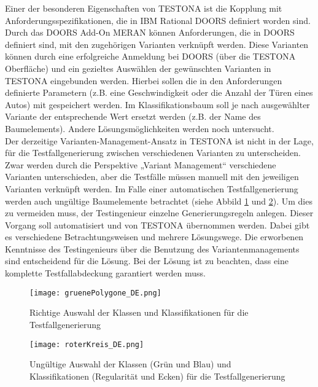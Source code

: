 Einer der besonderen Eigenschaften von TESTONA ist die Kopplung mit Anforderungsspezifikationen, die in IBM Rational DOORS definiert worden sind. Durch das DOORS Add-On MERAN können Anforderungen, die in DOORS definiert sind, mit den zugehörigen Varianten verknüpft werden. Diese Varianten können durch eine erfolgreiche Anmeldung bei DOORS (über die TESTONA Oberfläche) und ein gezieltes Auswählen der gewünschten Varianten in TESTONA eingebunden werden. Hierbei sollen die in den Anforderungen definierte Parametern (z.B. eine Geschwindigkeit oder die Anzahl der Türen eines Autos) mit gespeichert werden. Im Klassifikationsbaum soll je nach ausgewählter Variante der entsprechende Wert ersetzt werden (z.B. der Name des Baumelements). Andere Lösungsmöglichkeiten werden noch untersucht.\\

Der derzeitige Varianten-Management-Ansatz in TESTONA ist nicht in der Lage, für die Testfallgenerierung zwischen verschiedenen Varianten zu unterscheiden. Zwar werden durch die Perspektive „Variant Management“ verschiedene Varianten unterschieden, aber die Testfälle müssen manuell mit den jeweiligen Varianten verknüpft werden. Im Falle einer automatischen Testfallgenerierung werden auch ungültige Baumelemente betrachtet (siehe Abbild \ref{ttn.gruen} und \ref{ttn.rot}). Um dies zu vermeiden muss, der Testingenieur einzelne Generierungsregeln anlegen. Dieser Vorgang soll automatisiert und von TESTONA übernommen werden. Dabei gibt es verschiedene Betrachtungsweisen und mehrere Lösungswege. Die erworbenen Kenntnisse des Testingenieurs über die Benutzung des Variantenmanagements sind entscheidend für die Lösung. Bei der Lösung ist zu beachten, dass eine komplette Testfallabdeckung garantiert werden muss.\\


\begin{figure}[h]
  \begin{center}
    \texttt{[image: gruenePolygone\_DE.png]}
  		  \caption{Richtige Auswahl der Klassen und Klassifikationen für die Testfallgenerierung}
     \label{ttn.gruen}
  \end{center}
\end{figure}


\begin{figure}[h]
  \begin{center}
    \texttt{[image: roterKreis\_DE.png]}
  		  \caption{Ungültige Auswahl der Klassen (Grün und Blau) und Klassifikationen (Regularität und Ecken) für die Testfallgenerierung}
     \label{ttn.rot}
  \end{center}
\end{figure}


